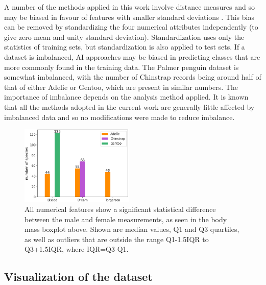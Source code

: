 \documentclass[12pt]{article}
\begin{document}
A number of the methods applied in this work involve distance measures 
and so may be biased in favour of features with smaller standard deviations \cite{hastie2009elements}. 
This bias can be removed by standardizing the four numerical attributes independently 
(to give zero mean and unity standard deviation). 
Standardization uses only the statistics of training sets, 
but standardization is also applied to test sets. If a dataset is imbalanced, 
AI approaches may be biased in predicting classes that are more commonly found in the training data. 
The Palmer penguin dataset is somewhat imbalanced, 
with the number of Chinstrap records being around half of that of either Adelie or Gentoo, 
which are present in similar numbers. 
The importance of imbalance depends on the analysis method applied. 
It is known that all the methods adopted in the current work are generally little affected by imbalanced data \cite{he2009learning} 
and so no modifications were made to reduce imbalance.

\begin{figure} %
  \centering
  \vspace{-0.5\baselineskip} %
  \includegraphics[width=0.48\textwidth]{islands.png} %
  \vspace{-0.5\baselineskip} %
  \caption{All numerical features show a significant statistical difference between the male and female measurements, as seen in the body mass boxplot above. Shown are median values, Q1 and Q3 quartiles, as well as outliers that are outside the range Q1-1.5IQR to Q3+1.5IQR, where IQR=Q3-Q1.}
  \vspace{-0.5\baselineskip} %
  \label{fig:islands}
\end{figure}

\vspace{\baselineskip}
\subsection*{Visualization of the dataset}
\end{document}
